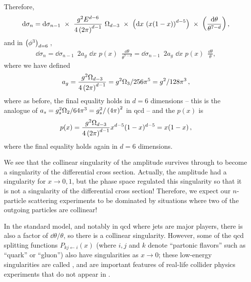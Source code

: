 Therefore,
\begin{align}
    \dd\sigma_n
    =
    \dd \sigma_{n-1}
    \,\,
    \times
    \,\,
    \frac{g^2 E^{d-6}}{4\left(2\pi\right)^{d-1}}
    \,\,
    \Omega_{d-3}
    \,\,
    \times
    \,\,
    \left(
        \dd x
        \,
        \left( x (1-x) \right)^{d-5}
    \right)
    \,\,
    \times
    \,\,
    \left(
        \frac{\dd\theta}{\theta^{7-d}}
    \right)
    ,
\end{align}
and in \(\left(\phi^3\right)_{d=6}{}\),
\begin{align}
    \dd\sigma_n
    =
    \dd \sigma_{n-1}
    \,\,\,
    2 a_g
    \,\,
    \dd x\,\, p(x)
    \,\,\,
    \frac{\dd \theta}{\theta^{7-d}}
    =
    \dd \sigma_{n-1}
    \,\,\,
    2 a_g
    \,\,
    \dd x\,\, p(x)
    \,\,\,
    \frac{\dd \theta}{\theta}
    ,
\end{align}
where we have defined
\begin{align}
    a_g
    =
    \frac{g^2\Omega_{d-3}}{4 \left(2 \pi\right)^{d-1}}
    =
    g^2 \Omega_3 / 256 \pi^5 = g^2 / 128 \pi^3
    \,,
\end{align}
where as before, the final equality holds in \(d=6\) dimensions -- this is the \phicubedsix{} analogue of \(a_s = g_s^2 \Omega_2 / 64 \pi^3 = g_s^2 / \left(4 \pi\right)^2\) in \gls{qcd} -- and the  \(p(x)\) is
\begin{align}
    p(x)
    =
    \frac{g^2\Omega_{d-3}}{4 \left(2 \pi\right)^{d-1}}
    x^{d-5}(1-x)^{d-5}
    =
    x(1-x)
    \,,
\end{align}
where the final equality holds again in \(d=6\) dimensions.

We see that the collinear singularity of the amplitude survives through to become a singularity of the differential cross section.
%
Actually, the amplitude had a singularity for \(x \to 0, 1\), but the phase space regulated this singularity so that it is not a singularity of the differential cross section!
%
Therefore, we expect our \(n\)-particle scattering experiments to be dominated by situations where two of the outgoing particles are collinear!

In the standard model, and notably in \gls{qcd} where jets are major players, there is also a factor of \(\dd\theta/\theta\), so there is a collinear singularity.
%
However, some of the \gls{qcd} splitting functions \(P_{kj\leftarrow i}(x)\) (where \(i, j\) and \(k\) denote ``partonic flavors'' such as ``quark'' or ``gluon'') also have singularities as \(x \to 0\);
%
these low-energy singularities are called , and are important features of real-life collider physics experiments that do not appear in \phicubedsix.


